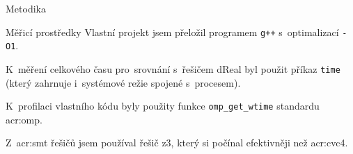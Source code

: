 \documentclass[thesis=M,czech]{FITthesis}[2012/06/26]
\newcommand{\acrlabel}[1]{acr:#1}
\newcommand{\acr}[1]{\acrshort{\acrlabel{#1}}}
\newcommand{\id}[1]{\texttt{#1}}
\begin{document}
\begin{section}{Metodika}
\begin{subsection}{Měřicí prostředky}
Vlastní projekt jsem přeložil
programem \id{g++}
s~optimalizací \id{-O1}.

K~měření celkového času pro~srovnání s~řešičem dReal
byl použit příkaz \id{time}
(který zahrnuje i~systémové režie spojené s~procesem).

K~profilaci vlastního kódu byly použity
funkce \id{omp\_\-get\_\-wtime}
standardu \acr{omp}.

Z~\acr{smt} řešičů jsem používal řešič z3,
který si počínal efektivněji než \acr{cvc}4.
\end{subsection} %


\end{section} %


\end{document}
